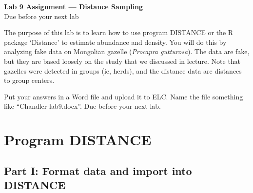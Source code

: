 \documentclass[12pt]{article}\usepackage[]{graphicx}\usepackage[]{color}
\begin{document}
{
  \Large
  \centering
  {\bf Lab 9 Assignment --- Distance Sampling} \\
  Due before your next lab \par
}

\vspace{10pt}


The purpose of this lab is to learn how to use program DISTANCE or the
R package `Distance' to estimate abundance and density. You will
do this by analyzing fake data on Mongolian gazelle ({\it Procapra
  gutturosa}). The data are fake, but they are based loosely on the
study that we discussed in lecture. Note that gazelles were detected
in groups (ie, herds), and the distance data are distances to group
centers. 

Put your answers in a Word file and upload it to ELC. Name the file
something like ``Chandler-lab9.docx''. Due before your next lab.  





\section*{Program DISTANCE}

\subsection*{\large Part I: Format data and import into DISTANCE}
\end{document}

